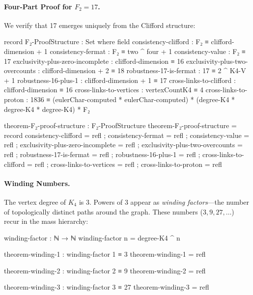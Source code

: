 \documentclass[11pt,a4paper]{book}
\begin{document}
\paragraph{Four-Part Proof for $F_2 = 17$.}

We verify that 17 emerges uniquely from the Clifford structure:

\begin{code}
record F₂-ProofStructure : Set where
  field
    consistency-clifford : F₂ ≡ clifford-dimension + 1
    consistency-fermat : F₂ ≡ two ^ four + 1
    consistency-value : F₂ ≡ 17
    exclusivity-plus-zero-incomplete : clifford-dimension ≡ 16
    exclusivity-plus-two-overcounts : clifford-dimension + 2 ≡ 18
    robustness-17-is-fermat : 17 ≡ 2 ^ K4-V + 1
    robustness-16-plus-1 : clifford-dimension + 1 ≡ 17
    cross-links-to-clifford : clifford-dimension ≡ 16
    cross-links-to-vertices : vertexCountK4 ≡ 4
    cross-links-to-proton : 1836 ≡ (eulerChar-computed * eulerChar-computed) * (degree-K4 * degree-K4 * degree-K4) * F₂

theorem-F₂-proof-structure : F₂-ProofStructure
theorem-F₂-proof-structure = record
  { consistency-clifford = refl
  ; consistency-fermat = refl
  ; consistency-value = refl
  ; exclusivity-plus-zero-incomplete = refl
  ; exclusivity-plus-two-overcounts = refl
  ; robustness-17-is-fermat = refl
  ; robustness-16-plus-1 = refl
  ; cross-links-to-clifford = refl
  ; cross-links-to-vertices = refl
  ; cross-links-to-proton = refl
  }
\end{code}

\paragraph{Winding Numbers.}

The vertex degree of $K_4$ is 3. Powers of 3 appear as \emph{winding factors}—the number 
of topologically distinct paths around the graph. These numbers ($3, 9, 27, \ldots$) recur 
in the mass hierarchy:

\begin{code}
winding-factor : ℕ → ℕ
winding-factor n = degree-K4 ^ n

theorem-winding-1 : winding-factor 1 ≡ 3
theorem-winding-1 = refl

theorem-winding-2 : winding-factor 2 ≡ 9
theorem-winding-2 = refl

theorem-winding-3 : winding-factor 3 ≡ 27
theorem-winding-3 = refl
\end{code}
\end{document}
